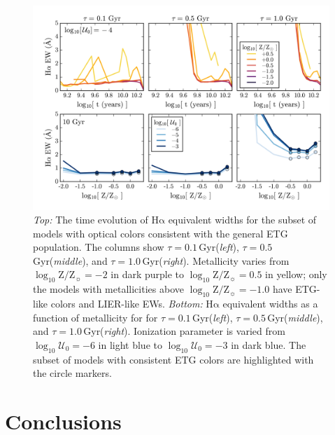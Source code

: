 \documentclass[preprint2]{aastex62}
\newcommand{\ha}{\ensuremath{\mathrm{H\alpha}}\xspace}
\newcommand{\logten}{\ensuremath{\log_{10}}}
\newcommand{\logZeq}[1]{\ensuremath{\logten \mathrm{Z}/\mathrm{Z}_{\sun} = #1}}
\newcommand{\logUeq}[1]{\ensuremath{\logten \mathcal{U}_0 = #1}}
\newcommand{\Gyr}{$\,$Gyr\xspace}
\begin{document}
\begin{figure}
  \begin{center}
    \includegraphics[width=\linewidth]{figs/f13.png}
    \caption{\emph{Top:} The time evolution of \ha equivalent widths for the subset of models with optical colors consistent with the general ETG population. The columns show $\tau=0.1$\Gyr (\emph{left}),  $\tau=0.5$\Gyr (\emph{middle}), and $\tau=1.0$\Gyr (\emph{right}). Metallicity varies from \logZeq{-2} in dark purple to \logZeq{0.5} in yellow; only the models with metallicities above \logZeq{-1.0} have ETG-like colors and LIER-like EWs. \emph{Bottom:} \ha equivalent widths as a function of metallicity for for $\tau=0.1$\Gyr (\emph{left}),  $\tau=0.5$\Gyr (\emph{middle}), and $\tau=1.0$\Gyr (\emph{right}). Ionization parameter is varied from \logUeq{-6} in light blue to \logUeq{-3} in dark blue. The subset of models with consistent ETG colors are highlighted with the circle markers.}
    \label{fig:linearEW}
  \end{center}
\end{figure}

\section{Conclusions}\label{sec:conclusions}
\end{document}
